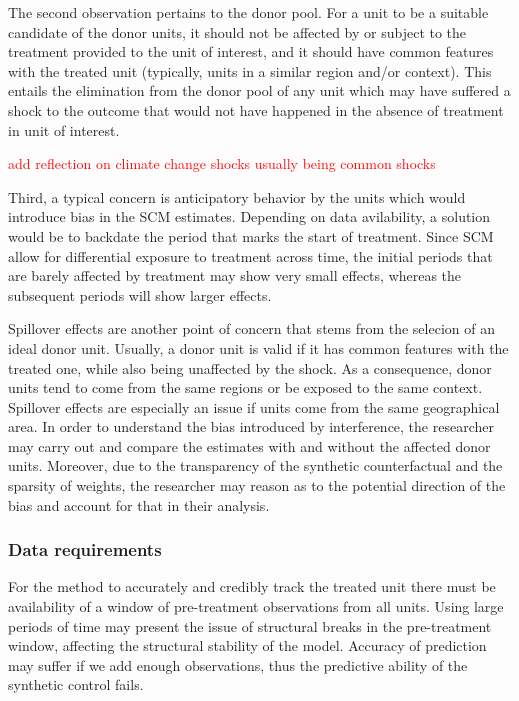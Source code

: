 \documentclass[12pt,a4paper,draft]{article}
\begin{document}
The second observation pertains to the donor pool. For a unit to be a suitable 
candidate of the donor units, it should not be affected by or subject to the 
treatment provided to the unit of interest, and it should have common features 
with the treated unit (typically, units in a similar region and/or context). 
This entails the elimination from the 
donor pool of any unit which may have suffered a shock to the outcome that would 
not have happened in the absence of treatment in unit of interest.

\textcolor{red}{add reflection on climate change shocks usually being common shocks}

Third, a typical concern is anticipatory behavior by the units which would 
introduce bias in the SCM estimates. Depending on data avilability, a solution 
would be to backdate the period that marks the start of treatment. Since SCM allow 
for differential exposure to treatment across time, the initial periods that 
are barely affected by treatment may show very small effects, whereas the subsequent 
periods will show larger effects.

Spillover effects are another point of concern that stems from the selecion of 
an ideal donor unit. Usually, a donor unit is valid if it has common features 
with the treated one, while also being unaffected by the shock. As a consequence, 
donor units tend to come from the same regions or be exposed to the same 
context. Spillover effects are especially an issue if units come from the same 
geographical area. In order to understand the bias introduced by interference, 
the researcher may carry out and compare the estimates with and without the 
affected donor units. Moreover, due to the transparency of the synthetic 
counterfactual and the sparsity of weights, the researcher may reason as to the 
potential direction of the bias and account for that in their analysis.

\subsubsection{Data requirements}

For the method to accurately and credibly track the treated unit there must be 
availability of a window of pre-treatment observations from all units. Using large 
periods of time may present the issue of structural breaks in the pre-treatment 
window, affecting the structural stability of the model. Accuracy of prediction 
may suffer if we add enough observations, thus the predictive ability of the 
synthetic control fails.
\end{document}
